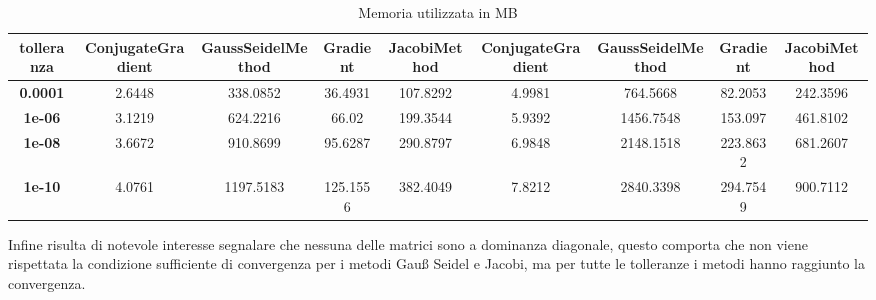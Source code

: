 \begin{table}[!ht]
\begin{subtable}[!ht]{1\textwidth}
{\begin{tabular}{@{}ccccc|cccc@{}}
                \textbf{tolleranza}        &
                \textbf{ConjugateGradient} &
                \textbf{GaussSeidelMethod} &
                \textbf{Gradient}          &
                \textbf{JacobiMethod}      &
                \textbf{ConjugateGradient} &
                \textbf{GaussSeidelMethod} &
                \textbf{Gradient}          &
                \textbf{JacobiMethod}                                                                                                                                                \\ \midrule
                \textbf{0.0001}            & 2.6448                             & 338.0852                          & 36.4931  & 107.8292 & 4.9981 & 764.5668  & 82.2053  & 242.3596 \\
                \textbf{1e-06}             & 3.1219                             & 624.2216                          & 66.02    & 199.3544 & 5.9392 & 1456.7548 & 153.097  & 461.8102 \\
                \textbf{1e-08}             & 3.6672                             & 910.8699                          & 95.6287  & 290.8797 & 6.9848 & 2148.1518 & 223.8632 & 681.2607 \\
                \textbf{1e-10}             & 4.0761                             & 1197.5183                         & 125.1556 & 382.4049 & 7.8212 & 2840.3398 & 294.7549 & 900.7112 \\ \bottomrule
            \end{tabular}
        }
        \caption{Vem 1 e Vem 2}
        \label{tab:vem_mem}
    \end{subtable}
    \caption{Memoria utilizzata in MB}
    \label{tab:memory}
\end{table}

Infine risulta di notevole interesse segnalare che nessuna delle matrici sono a
dominanza diagonale, questo comporta che non viene rispettata la condizione sufficiente
di convergenza per i metodi Gauß Seidel e Jacobi, ma per tutte le tolleranze i metodi
hanno raggiunto la convergenza.

